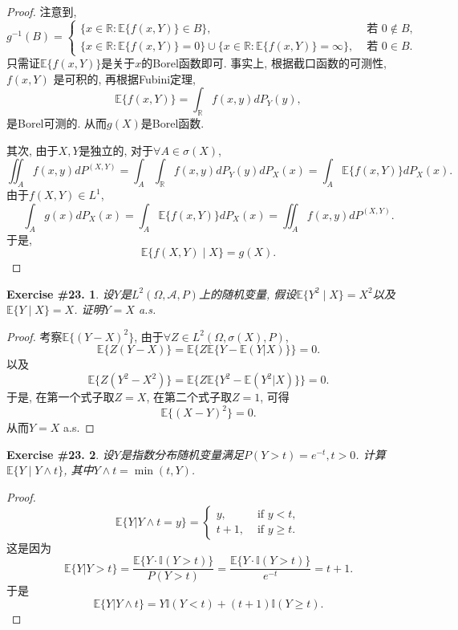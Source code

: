 \documentclass[UTF8, a4paper]{article}
\newtheorem{exercise}{Exercise \#23.}
\begin{document}
\begin{proof}
注意到, 
$$
g^{-1}(B) = \begin{cases}
\{x \in \mathbb{R}: \mathbb{E}\{f(x, Y)\} \in B\}, & \text{ 若 } 0 \not\in B, \\
\{x \in \mathbb{R}: \mathbb{E}\{f(x, Y)\} =0\} \cup \{x \in \mathbb{R}: \mathbb{E}\{f(x, Y)\} = \infty\}, & \text{ 若 } 0 \in B.
\end{cases}
$$
只需证\(\mathbb{E}\{f(x, Y)\}\)是关于\(x\)的Borel函数即可.
事实上, 根据截口函数的可测性, 
$
f(x,Y)
$
是可积的, 再根据Fubini定理, 
$$
\mathbb{E}\{f(x,Y)\} = \int_{\mathbb{R}} f(x,y) dP_Y(y), 
$$
是Borel可测的.
从而\(g(X)\)是Borel函数.

其次, 由于\(X, Y\)是独立的, 对于\(\forall A\in \sigma(X)\), 
$$
\iint_A f(x,y) dP^{(X,Y)} = \int_A \int_{\mathbb{R}} f(x,y) dP_Y(y) dP_X(x) = \int_A \mathbb{E}\{f(x,Y)\} dP_X(x).
$$
由于\(f(X,Y) \in L^1\), 
$$
\int_A g(x) dP_X(x) = \int_A \mathbb{E}\{f(x,Y)\} dP_X(x) = \iint_A f(x,y) dP^{(X,Y)}.
$$
于是, 
$$
\mathbb{E}\{f(X,Y) \mid X\} = g(X).
$$

\end{proof}


\begin{framed}
\begin{exercise}
设\(Y\)是\(L^2(\Omega, \mathcal{A}, P)\)上的随机变量, 假设\(\mathbb{E}\{Y^2 \mid X\} = X^2\)以及\(\mathbb{E}\{Y \mid X\} = X\).
证明\(Y = X\) a.s.
\end{exercise}
\end{framed}

\begin{proof}
考察\(\mathbb{E}\{(Y-X)^2\}\), 
由于\(\forall Z \in L^2(\Omega, \sigma(X), P)\), 
$$
\mathbb{E}\{Z(Y-X)\} = \mathbb{E}\{Z\mathbb{E}\{Y - \mathbb{E}(Y|X)\}\} = 0.
$$
以及
$$
\mathbb{E}\{Z(Y^2-X^2)\} = \mathbb{E}\{Z\mathbb{E}\{Y^2 - \mathbb{E}(Y^2|X)\}\} = 0.
$$
于是, 在第一个式子取\(Z = X\), 在第二个式子取\(Z = 1\),
可得
$$
\mathbb{E}\{(X-Y)^2\} = 0.
$$
从而\(Y = X\) a.s.
\end{proof}



\begin{framed}
\begin{exercise}
设\(Y\)是指数分布随机变量满足\(P(Y > t) = e^{-t}, t >0\).
计算\(\mathbb{E}\{Y \mid Y \wedge t\}\), 其中\(Y \wedge t = \min(t,Y)\).
\end{exercise}
\end{framed}


\begin{proof}
$$
\mathbb{E}\{Y|Y \wedge t = y\} = 
\begin{cases}
    y, & \text{ if } y < t, \\
    t+1, & \text{ if } y \geq t.
\end{cases}
$$
这是因为
$$
\mathbb{E}\{Y|Y>t\} = \frac{\mathbb{E}\{Y\cdot \mathbb{I}(Y>t)\}}{P(Y > t)} = \frac{\mathbb{E}\{Y\cdot \mathbb{I}(Y>t)\}}{e^{-t}} = t+1.
$$
于是 
$$
\mathbb{E}\{Y|Y \wedge t\} = Y \mathbb{I}(Y < t) + (t+1) \mathbb{I}(Y \geq t).
$$
\end{proof}
\end{document}
